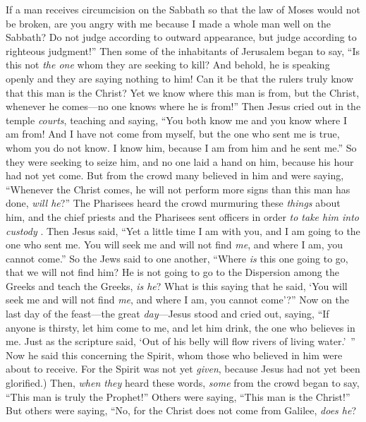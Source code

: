 \begin{biblechapter}
\verse If a man receives circumcision on the Sabbath so that the law of Moses would not be broken, are you angry with me because I made a whole man well on the Sabbath?
\verse Do not judge according to outward appearance, but judge according to righteous judgment!”
 Then some of the inhabitants of Jerusalem began to say, “Is this not \textit{the one} whom they are seeking to kill?
\verse And behold, he is speaking openly and they are saying nothing to him! Can it be that the rulers truly know that this man is the Christ?
\verse Yet we know where this man is from, but the Christ, whenever he comes—no one knows where he is from!”
\verse Then Jesus cried out in the temple \textit{courts}, teaching and saying, “You both know me and you know where I am from! And I have not come from myself, but the one who sent me is true, whom you do not know.
\verse I know him, because I am from him and he sent me.”
\verse So they were seeking to seize him, and no one laid a hand on him, because his hour had not yet come.
\verse But from the crowd many believed in him and were saying, “Whenever the Christ comes, he will not perform more signs than this man has done, \textit{will he}?”
\verse The Pharisees heard the crowd murmuring these \textit{things} about him, and the chief priests and the Pharisees sent officers in order \textit{to take him into custody }.
\verse Then Jesus said, “Yet a little time I am with you, and I am going to the one who sent me.
\verse You will seek me and will not find \textit{me}, and where I am, you cannot come.”
\verse So the Jews said to one another, “Where \textit{is} this one going to go, that we will not find him? He is not going to go to the Dispersion among the Greeks and teach the Greeks, \textit{is he}?
\verse What is this saying that he said, ‘You will seek me and will not find \textit{me}, and where I am, you cannot come’?”
 Now on the last day of the feast—the great \textit{day}—Jesus stood and cried out, saying, “If anyone is thirsty, let him come to me, and let him drink,
\verse the one who believes in me. Just as the scripture said, ‘Out of his belly will flow rivers of living water.’ ”
\verse Now he said this concerning the Spirit, whom those who believed in him were about to receive. For the Spirit was not yet \textit{given}, because Jesus had not yet been glorified.)
 Then, \textit{when they} heard these words, \textit{some} from the crowd began to say, “This man is truly the Prophet!”
\verse Others were saying, “This man is the Christ!” But others were saying, “No, for the Christ does not come from Galilee, \textit{does he}?

\end{biblechapter}

